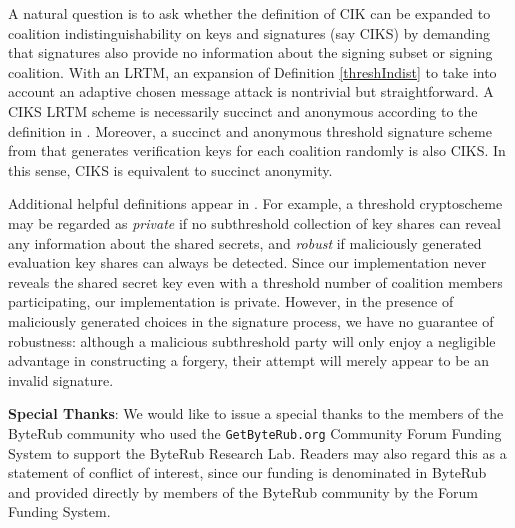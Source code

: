 \documentclass{mrl}
\theoremstyle{definition}
\begin{document}
A natural question is to ask whether the definition of CIK can be expanded to coalition indistinguishability on keys and signatures (say CIKS) by demanding that signatures also provide no information about the signing subset or signing coalition.  With an LRTM, an expansion of Definition \ref{threshIndist} to take into account an adaptive chosen message attack is nontrivial but straightforward. A CIKS LRTM scheme is necessarily succinct and anonymous according to the definition in \cite{bonehthreshold}. Moreover, a succinct and anonymous threshold signature scheme from \cite{bonehthreshold} that generates verification keys for each coalition randomly is also CIKS. In this sense, CIKS is equivalent to succinct anonymity. 


Additional helpful definitions appear in \cite{bonehthreshold}. For example, a threshold cryptoscheme may be regarded as \textit{private} if no subthreshold collection of key shares can reveal any information about the shared secrets, and \textit{robust} if maliciously generated evaluation key shares can always be detected. Since our implementation never reveals the shared secret key even with a threshold number of coalition members participating, our implementation is private. However, in the presence of maliciously generated choices in the signature process, we have no guarantee of robustness: although a malicious subthreshold party will only enjoy a negligible advantage in constructing a forgery, their attempt will merely appear to be an invalid signature.

\vspace{0.1in}

\textbf{Special Thanks}: We would like to issue a special thanks to the members of the ByteRub community who used the \texttt{GetByteRub.org} Community Forum Funding System to support the ByteRub Research Lab. Readers may also regard this as a statement of conflict of interest, since our funding is denominated in ByteRub and provided directly by members of the ByteRub community by the Forum Funding System.

\medskip{}



\end{document}

